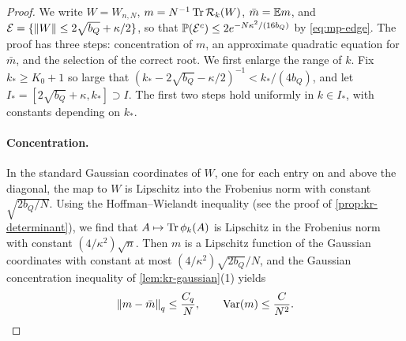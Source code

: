 \begin{proof}
We write $W=W_{n,N}$, $m=N^{-1}\operatorname{Tr}\mathcal R_k(W)$, $\bar m=\mathbb E m$, and $\mathcal E=\{\left\lVert W\right\rVert\le2\sqrt{b_Q}+\kappa/2\}$, so that $\mathbb P(\mathcal E^c)\le2e^{-N\kappa^2/(16b_Q)}$ by \eqref{eq:mp-edge}. The proof has three steps: concentration of $m$, an approximate quadratic equation for $\bar m$, and the selection of the correct root. We first enlarge the range of $k$. Fix $k_*\ge K_0+1$ so large that $(k_*-2\sqrt{b_Q}-\kappa/2)^{-1}<k_*/(4b_Q)$, and let $I_*=[2\sqrt{b_Q}+\kappa,k_*]\supset I$. The first two steps hold uniformly in $k\in I_*$, with constants depending on $k_*$.

\paragraph{Concentration.}
In the standard Gaussian coordinates of $W$, one for each entry on and above the diagonal, the map to $W$ is Lipschitz into the Frobenius norm with constant $\sqrt{2b_Q/N}$. Using the Hoffman--Wielandt inequality (see the proof of \cref{prop:kr-determinant}), we find that $A\mapsto\operatorname{Tr}\phi_k(A)$ is Lipschitz in the Frobenius norm with constant $(4/\kappa^2)\sqrt n$. Then $m$ is a Lipschitz function of the Gaussian coordinates with constant at most $(4/\kappa^2)\sqrt{2b_Q}/N$, and the Gaussian concentration inequality of \cref{lem:kr-gaussian}(1) yields
\begin{equation}\label{eq:mp-trace-conc}
\left\lVert m-\bar m\right\rVert_q\le\frac{C_q}N,\qquad \operatorname{Var}(m)\le\frac C{N^2}.
\end{equation}


\end{proof}
